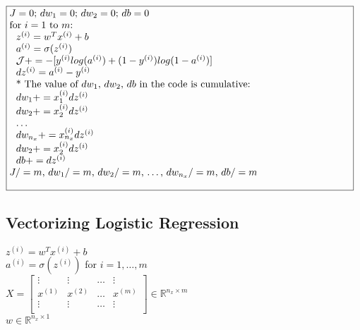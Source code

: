 \documentclass{article}
\begin{document}
$\noindent\fbox{%
\parbox{\textwidth}{%
$J=0$; $dw_1 = 0$; $dw_2 = 0$; $db=0$\\

for $i=1$ to $m$:\\
$\indent$ $\indent$ $z^{(i)} = w^T x^{(i)} + b$\\
$\indent$ $\indent$ $a^{(i)} = \sigma(z^{(i)})$\\
$\indent$ $\indent$ $\mathcal{J} += -[y^{(i)} log(a^{(i)}) + (1-y^{(i)})log(1-a^{(i)})]$\\
$\indent$ $\indent$ $dz^{(i)} = a^{(i)}- y^{(i)}$\\

$\indent$ $\indent$ * The value of $dw_1$, $dw_2$, $db$ in the code is cumulative:\\
$\indent$ $\indent$ $dw_1 += x_1^{(i)}dz^{(i)}$\\
$\indent$ $\indent$ $dw_2 += x_2^{(i)}dz^{(i)}$\\
$\indent$ $\indent$ $\dots$\\
$\indent$ $\indent$ $dw_{n_x} += x_{n_x}^{(i)}dz^{(i)}$\\

$\indent$ $\indent$ $dw_2 += x_2^{(i)}dz^{(i)}$\\
$\indent$ $\indent$ $db += dz^{(i)}$\\

$J/=m$,  $dw_1 /=m$,  $dw_2 /=m$, \dots, $dw_{n_x} /=m$, $db /=m$\\

    }%
}$\\



\newpage
\subsection{Vectorizing Logistic Regression}

$z^{(i)} = w^T x^{(i)} + b$\\
$a^{(i)} = \sigma(z^{(i)})$ for $i=1, \dots, m$\\

$X =
\begin{bmatrix}
\vdots & \vdots & \dots & \vdots \\
x^{(1)} & x^{(2)} & \dots & x^{(m)}\\
\vdots & \vdots & \dots & \vdots \\
\end{bmatrix} \in \mathbb{R}^{n_x \times m}
$\\

$w \in \mathbb{R}^{n_x \times 1}$\\
\end{document}
